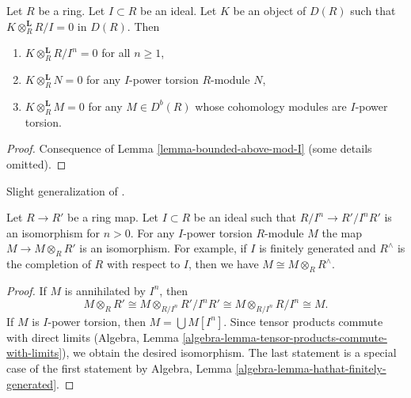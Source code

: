 \begin{lemma}
\label{lemma-derived-vanishing-mod-I}
Let $R$ be a ring. Let $I \subset R$ be an ideal. Let $K$ be an object of
$D(R)$ such that $K \otimes_R^\mathbf{L} R/I = 0$ in $D(R)$. Then
\begin{enumerate}
\item $K \otimes_R^\mathbf{L} R/I^n = 0$ for all $n \geq 1$,
\item $K \otimes_R^\mathbf{L} N = 0$ for any $I$-power torsion
$R$-module $N$,
\item $K \otimes_R^\mathbf{L} M = 0$ for any $M \in D^b(R)$ whose
cohomology modules are $I$-power torsion.
\end{enumerate}
\end{lemma}

\begin{proof}
Consequence of Lemma \ref{lemma-bounded-above-mod-I} (some details
omitted).
\end{proof}

\begin{lemma}
\label{lemma-torsion-completion}
\begin{reference}
Slight generalization of \cite[Lemme~1]{Beauville-Laszlo}.
\end{reference}
Let $R \to R'$ be a ring map. Let $I \subset R$ be an ideal such that
$R/I^n \to R'/I^nR'$ is an isomorphism for $n > 0$.
For any $I$-power torsion $R$-module $M$ the map $M \to M \otimes_R R'$
is an isomorphism.
For example, if $I$ is finitely generated and $R^\wedge$ is the completion
of $R$ with respect to $I$, then we have $M \cong M \otimes_R R^\wedge$.
\end{lemma}

\begin{proof}
If $M$ is annihilated by $I^n$, then
$$
M \otimes_R R' \cong
M \otimes_{R/I^n} R'/I^n R' \cong
M \otimes_{R/I^n} R/I^n \cong M.
$$
If $M$ is $I$-power torsion, then $M = \bigcup M[I^n]$.
Since tensor products commute with direct limits
(Algebra, Lemma \ref{algebra-lemma-tensor-products-commute-with-limits}),
we obtain the desired isomorphism. The last statement is a special
case of the first statement by Algebra, Lemma
\ref{algebra-lemma-hathat-finitely-generated}.
\end{proof}







